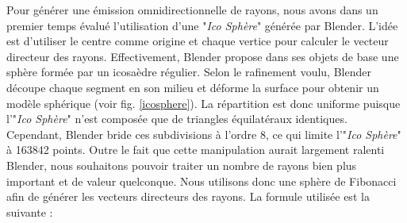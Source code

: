 Pour générer une émission omnidirectionnelle de rayons, nous avons dans un premier temps évalué l'utilisation d'une "\textit{Ico Sphère}" générée par Blender. L'idée est d'utiliser le centre comme origine et chaque vertice pour calculer le vecteur directeur des rayons. Effectivement, Blender propose dans ses objets de base une sphère formée par un icosaèdre régulier. Selon le rafinement voulu, Blender découpe chaque segment en son milieu et déforme la surface pour obtenir un modèle sphérique (voir fig. \ref{icosphere}). La répartition est donc uniforme puisque l'"\textit{Ico Sphère}" n'est composée que de triangles équilatéraux identiques. Cependant, Blender bride ces subdivisions à l'ordre 8, ce qui limite l'"\textit{Ico Sphère}" à 163842 points. Outre le fait que cette manipulation aurait largement ralenti Blender, nous souhaitons pouvoir traiter un nombre de rayons bien plus important et de valeur quelconque. Nous utilisons donc une sphère de Fibonacci afin de générer les vecteurs directeurs des rayons. La formule utilisée est la suivante :

